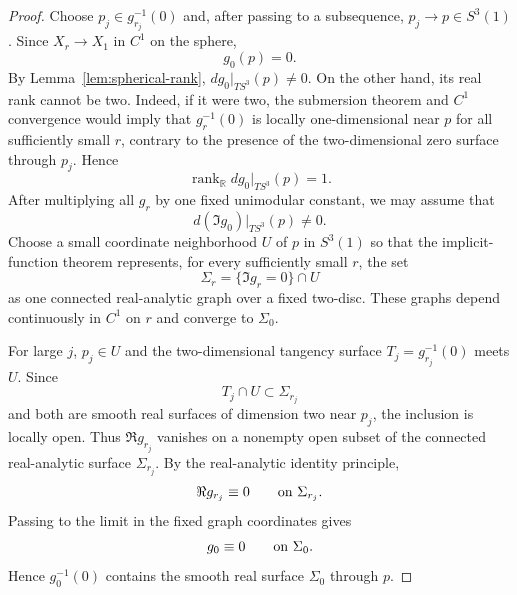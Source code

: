 \documentclass[11pt,reqno]{article}
\theoremstyle{remark}
\newcommand{\R}{\mathbb R}
\begin{document}
\begin{proof}
Choose $p_j\in g_{r_j}^{-1}(0)$ and, after passing to a subsequence, $p_j\to p\in S^3(1)$. Since $X_r\to X_1$ in $C^1$ on the sphere,
\[
 g_0(p)=0.
\]
By Lemma~\ref{lem:spherical-rank}, $dg_0|_{TS^3}(p)\ne0$. On the other hand, its real rank cannot be two. Indeed, if it were two, the submersion theorem and $C^1$ convergence would imply that $g_r^{-1}(0)$ is locally one-dimensional near $p$ for all sufficiently small $r$, contrary to the presence of the two-dimensional zero surface through $p_j$.
Hence
\[
 \operatorname{rank}_{\R}dg_0|_{TS^3}(p)=1.
\]
After multiplying all $g_r$ by one fixed unimodular constant, we may assume that
\[
 d(\Im g_0)|_{TS^3}(p)\ne0.
\]
Choose a small coordinate neighborhood $U$ of $p$ in $S^3(1)$ so that the implicit-function theorem represents, for every sufficiently small $r$, the set
\[
 \Sigma_r=\{\Im g_r=0\}\cap U
\]
as one connected real-analytic graph over a fixed two-disc. These graphs depend continuously in $C^1$ on $r$ and converge to $\Sigma_0$.

For large $j$, $p_j\in U$ and the two-dimensional tangency surface $T_j=g_{r_j}^{-1}(0)$ meets $U$. Since
\[
 T_j\cap U\subset\Sigma_{r_j}
\]
and both are smooth real surfaces of dimension two near $p_j$, the inclusion is locally open. Thus $\Re g_{r_j}$ vanishes on a nonempty open subset of the connected real-analytic surface $\Sigma_{r_j}$. By the real-analytic identity principle,
\[
 \Re g_{r_j}\equiv0\qquad\hbox{on }\Sigma_{r_j}.
\]
Passing to the limit in the fixed graph coordinates gives
\[
 g_0\equiv0\qquad\hbox{on }\Sigma_0.
\]
Hence $g_0^{-1}(0)$ contains the smooth real surface $\Sigma_0$ through $p$.
\end{proof}
\end{document}
